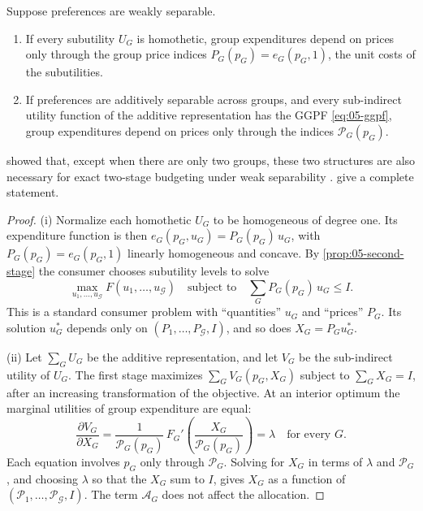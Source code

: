 \begin{proposition}\label{prop:05-first-stage}
Suppose preferences are weakly separable.
\begin{enumerate}[label=(\roman*)]
  \item If every subutility $U_G$ is homothetic, group expenditures depend on prices only through the
  group price indices $P_G(p_G) = e_G(p_G, 1)$, the unit costs of the subutilities.
  \item If preferences are additively separable across groups, and every sub-indirect utility function
  of the additive representation has the GGPF \eqref{eq:05-ggpf}, group expenditures depend on prices
  only through the indices $\mathcal{P}_G(p_G)$.
\end{enumerate}
\citet{Gorman1959} showed that, except when there are only two groups, these two structures are also
necessary for exact two-stage budgeting under weak separability \citep[\S 5.2,
p.~131]{DeatonMuellbauer1980b}. \citet{BlackorbyPrimontRussell1978} give a complete statement.
\end{proposition}

\begin{proof}
(i) Normalize each homothetic $U_G$ to be homogeneous of degree one. Its expenditure function is then
$e_G(p_G, u_G) = P_G(p_G)\, u_G$, with $P_G(p_G) = e_G(p_G, 1)$ linearly homogeneous and concave. By
\cref{prop:05-second-stage} the consumer chooses subutility levels to solve
\begin{equation*}
  \max_{u_1, \dots, u_{\mathcal{G}}} F(u_1, \dots, u_{\mathcal{G}})
  \quad\text{subject to}\quad \sum_G P_G(p_G)\, u_G \le I .
\end{equation*}
This is a standard consumer problem with ``quantities'' $u_G$ and ``prices'' $P_G$. Its solution $u_G^*$
depends only on $(P_1, \dots, P_{\mathcal{G}}, I)$, and so does $X_G = P_G u_G^*$.

(ii) Let $\sum_G U_G$ be the additive representation, and let $V_G$ be the sub-indirect utility of
$U_G$. The first stage maximizes $\sum_G V_G(p_G, X_G)$ subject to $\sum_G X_G = I$, after an increasing
transformation of the objective. At an interior optimum the marginal utilities
of group expenditure are equal:
\begin{equation*}
  \frac{\partial V_G}{\partial X_G} = \frac{1}{\mathcal{P}_G(p_G)}\,
  F_G'\!\left(\frac{X_G}{\mathcal{P}_G(p_G)}\right) = \lambda \quad \text{for every } G.
\end{equation*}
Each equation involves $p_G$ only through $\mathcal{P}_G$. Solving for $X_G$ in terms of $\lambda$ and
$\mathcal{P}_G$, and choosing $\lambda$ so that the $X_G$ sum to $I$, gives $X_G$ as a function of
$(\mathcal{P}_1, \dots, \mathcal{P}_{\mathcal{G}}, I)$. The term $\mathcal{A}_G$ does not affect the
allocation.
\end{proof}

